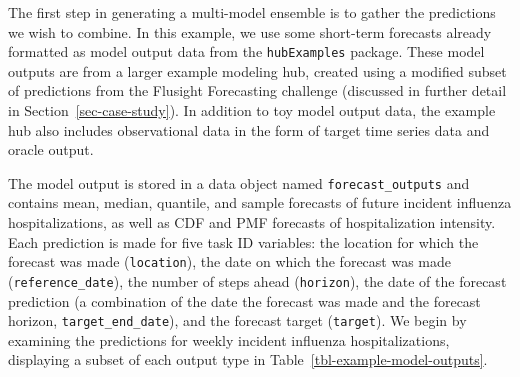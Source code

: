 \documentclass[
  letterpaper,
  DIV=11,
  numbers=noendperiod]{scrartcl}
\begin{document}
The first step in generating a multi-model ensemble is to gather the
predictions we wish to combine. In this example, we use some short-term
forecasts already formatted as model output data from the
\texttt{hubExamples} package. These model outputs are from a larger
example modeling hub, created using a modified subset of predictions
from the Flusight Forecasting challenge (discussed in further detail in
Section~\ref{sec-case-study}). In addition to toy model output data, the
example hub also includes observational data in the form of target time
series data and oracle output.

The model output is stored in a data object named
\texttt{forecast\_outputs} and contains mean, median, quantile, and
sample forecasts of future incident influenza hospitalizations, as well
as CDF and PMF forecasts of hospitalization intensity. Each prediction
is made for five task ID variables: the location for which the forecast
was made (\texttt{location}), the date on which the forecast was made
(\texttt{reference\_date}), the number of steps ahead
(\texttt{horizon}), the date of the forecast prediction (a combination
of the date the forecast was made and the forecast horizon,
\texttt{target\_end\_date}), and the forecast target (\texttt{target}).
We begin by examining the predictions for weekly incident influenza
hospitalizations, displaying a subset of each output type in
Table~\ref{tbl-example-model-outputs}.
\end{document}
